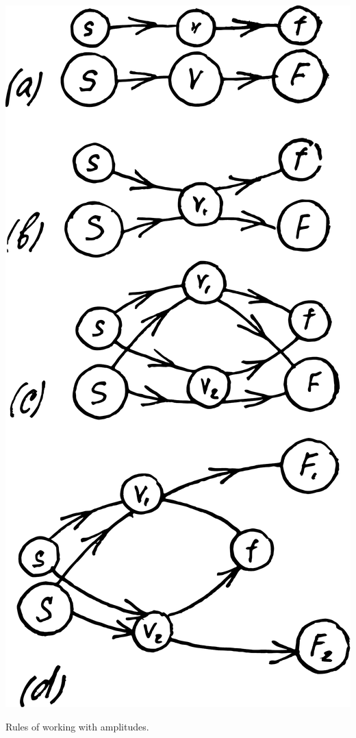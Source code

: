\documentclass[a4paper,sfsidenotes,colorlinks=true]{tufte-book}
\numberwithin{equation}{section}
\numberwithin{figure}{section}
\begin{document}
\begin{marginfigure}[1cm]
\centering
\includegraphics[width=\textwidth]{figures/fig-08-02.pdf}
\caption{Rules of working with amplitudes.}
\label{fig-8.2}
\end{marginfigure}
\end{document}
